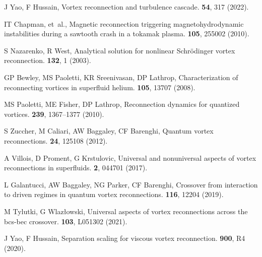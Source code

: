 \documentclass[9pt,twocolumn,twoside]{pnas-new}
\begin{document}
% 

\begin{thebibliography}{10}

	J Yao, F Hussain, Vortex reconnection and turbulence cascade.
	 \textbf{54}, 317 (2022).
	
	IT Chapman, et~al., Magnetic reconnection triggering magnetohydrodynamic instabilities during a sawtooth crash in a tokamak plasma.
	 \textbf{105}, 255002 (2010).
	
	S Nazarenko, R West, Analytical solution for nonlinear {Schr{\"o}dinger} vortex reconnection.
	 \textbf{132}, 1 (2003).
	
	GP Bewley, MS Paoletti, KR Sreenivasan, DP Lathrop, Characterization of reconnecting vortices in superfluid helium.
	 \textbf{105}, 13707 (2008).
	
	MS Paoletti, ME Fisher, DP Lathrop, Reconnection dynamics for quantized vortices.
	 \textbf{239}, 1367--1377 (2010).
	
	S Zuccher, M Caliari, AW Baggaley, CF Barenghi, Quantum vortex reconnections.
	 \textbf{24}, 125108 (2012).
	
	A Villois, D Proment, G Krstulovic, Universal and nonuniversal aspects of vortex reconnections in superfluids.
	 \textbf{2}, 044701 (2017).
	
	L Galantucci, AW Baggaley, NG Parker, CF Barenghi, Crossover from interaction to driven regimes in quantum vortex reconnections.
	 \textbf{116}, 12204 (2019).
	
	M Tylutki, G Wlaz{\l}owski, Universal aspects of vortex reconnections across the bcs-bec crossover.
	 \textbf{103}, L051302 (2021).
	
	J Yao, F Hussain, Separation scaling for viscous vortex reconnection.
	 \textbf{900}, R4 (2020).
	

\end{thebibliography}
\end{document}
